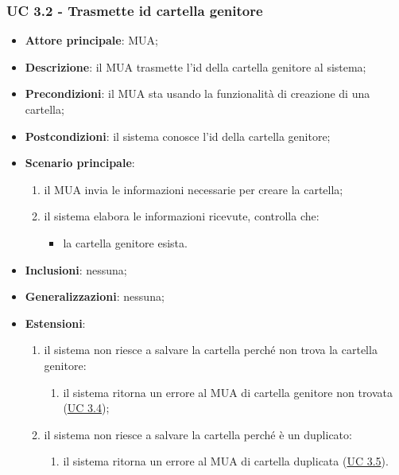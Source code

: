     \subsubsection{UC 3.2 - Trasmette id cartella genitore} \label{sec:UC3.2}
    \begin{itemize}
        \item \textbf{Attore principale}: MUA;
        \item \textbf{Descrizione}: il MUA trasmette l'id della cartella genitore al sistema;
        \item \textbf{Precondizioni}: il MUA sta usando la funzionalità di creazione di una cartella;
        \item \textbf{Postcondizioni}: il sistema conosce l'id della cartella genitore;
        \item \textbf{Scenario principale}:
            \begin{enumerate}
                \item il MUA invia le informazioni necessarie per creare la cartella;
                \item il sistema elabora le informazioni ricevute, controlla che:
                \begin{itemize}
                    \item la cartella genitore esista.
                \end{itemize}
            \end{enumerate}
        \item \textbf{Inclusioni}: nessuna;
        \item \textbf{Generalizzazioni}: nessuna;
        \item \textbf{Estensioni}:
            \begin{enumerate}[label=\alph*.]
                \item il sistema non riesce a salvare la cartella perché non trova la cartella genitore:
                \begin{enumerate}[label=\arabic*.]
                    \item il sistema ritorna un errore al MUA di cartella genitore non trovata (\hyperref[sec:UC3.4]{UC 3.4});
                    \end{enumerate}
                \item il sistema non riesce a salvare la cartella perché è un duplicato:
                \begin{enumerate}[label=\arabic*.]
                    \item il sistema ritorna un errore al MUA di cartella duplicata (\hyperref[sec:UC3.5]{UC 3.5}).
                \end{enumerate}
                
            \end{enumerate}
    \end{itemize}



